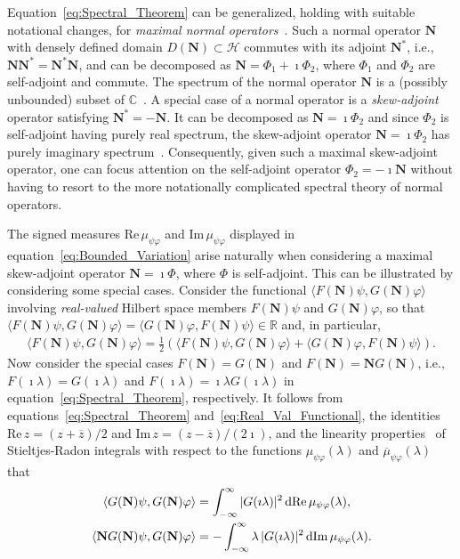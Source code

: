 \documentclass[leqno,onefignum,onetabnum]{siamltex1213}
\renewcommand{\d}{\mathrm{d}}
\newcommand\Real{\mbox{Re}\,} %
\newcommand\Imag{\mbox{Im}\,} %
\newcommand{\Nb}{\mathbf{N}}
\newcommand{\Hs}{\mathscr{H}}
\begin{document}
Equation~\eqref{eq:Spectral_Theorem} can be generalized, holding with
suitable notational changes, for \emph{maximal normal
  operators}~\cite{Stone:64}. Such a normal operator $\Nb$ with densely
defined domain $D(\Nb)\subset\Hs$ commutes with its adjoint $\Nb^*$, i.e.,
$\Nb\Nb^*=\Nb^*\Nb$, and can be decomposed as $\Nb=\Phi_1+\imath\Phi_2$, where
$\Phi_1$ and $\Phi_2$ are self-adjoint and commute. The spectrum of the
normal operator $\Nb$ is 
a (possibly unbounded) subset of $\mathbb{C}$~\cite{Stone:64}. A
special case of a normal operator is a \emph{skew-adjoint} operator
satisfying $\Nb^*=-\Nb$. It can be decomposed as $\Nb=\imath\Phi_2$ and since
$\Phi_2$ is self-adjoint having purely real spectrum, the skew-adjoint
operator $\Nb=\imath\Phi_2$ has purely imaginary
spectrum~\cite{Stone:64}. Consequently, given such a maximal
skew-adjoint operator, one can focus attention on the self-adjoint
operator $\Phi_2=-\imath\Nb$ without having to resort to the more notationally
complicated spectral theory of normal operators.





The signed measures $\Real\mu_{\psi\varphi}$ and $\Imag\mu_{\psi\varphi}$ displayed in
equation~\eqref{eq:Bounded_Variation} arise naturally when considering
a maximal skew-adjoint operator $\Nb=\imath\Phi$, where $\Phi$ is
self-adjoint. This can be illustrated by considering some special
cases. Consider the functional $\langle F(\Nb)\psi,G(\Nb)\varphi\rangle$ involving
\emph{real-valued} Hilbert space members $F(\Nb)\psi$ and $G(\Nb)\varphi$, so
that $\langle F(\Nb)\psi,G(\Nb)\varphi\rangle=\langle G(\Nb)\varphi,F(\Nb)\psi\rangle\in\mathbb{R}$ and, in
particular, 
%
\begin{align}\label{eq:Real_Val_Functional}
  \langle F(\Nb)\psi,G(\Nb)\varphi\rangle=\frac{1}{2}(\langle F(\Nb)\psi,G(\Nb)\varphi\rangle+\langle G(\Nb)\varphi,F(\Nb)\psi\rangle).
\end{align}
%
Now consider the special cases $F(\Nb)=G(\Nb)$ and $F(\Nb)=\Nb G(\Nb)$,
i.e., $F(\imath\lambda)=G(\imath\lambda)$ and $F(\imath\lambda)=\imath\lambda G(\imath\lambda)$ in
equation~\eqref{eq:Spectral_Theorem}, respectively. It follows 
from equations~\eqref{eq:Spectral_Theorem}
and~\eqref{eq:Real_Val_Functional}, the identities
$\Real z=(z+\overline{z})/2$ and $\Imag z=(z-\overline{z})/(2\imath)$, and
the linearity properties~\cite{Stone:64} of Stieltjes-Radon integrals
with respect to the functions $\mu_{\psi\varphi}(\lambda)$ and $\overline{\mu}_{\psi\varphi}(\lambda)$ that
%
\begin{align}\label{eq:Real_Imag_mu_Reps}
  \langle G(\Nb)\psi,G(\Nb)\varphi\rangle&=\int_{-\infty}^\infty|G(\imath\lambda)|^2\,\d\Real\mu_{\psi\varphi}(\lambda),
  \\
   \langle\Nb G(\Nb)\psi,G(\Nb)\varphi\rangle&=-\int_{-\infty}^\infty\lambda\,|G(\imath\lambda)|^2\,\d\Imag\mu_{\psi\varphi}(\lambda).
   \notag
\end{align}
%
\end{document}

